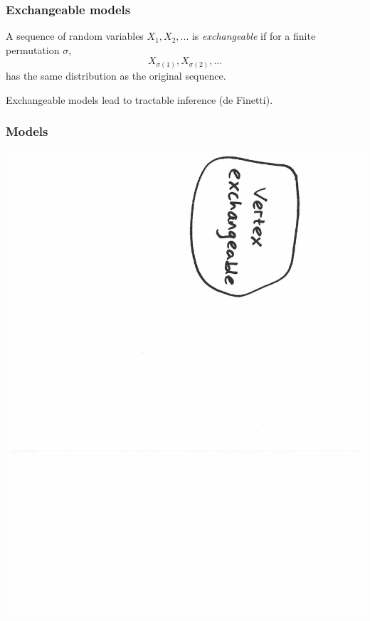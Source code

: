 \documentclass[final,hyperref={pdfpagelabels=false},noamsthm]{beamer}
\begin{document}
%	
%	

\begin{frame}
	\frametitle{Exchangeable models}
	A sequence of random variables $X_1, X_2, ...$ is \textit{exchangeable} if for a finite permutation $\sigma$,
	\begin{equation*}
		X_{\sigma(1)}, X_{\sigma(2)}, ...
	\end{equation*}
	has the same distribution as the original sequence.
	
	\vspace{20pt}
	Exchangeable models lead to tractable inference (de Finetti).
\end{frame}

\begin{frame}
	\frametitle{Models}
	\includegraphics[angle=90,origin=c,scale=0.4]{fig/models1}
\end{frame}
\end{document}
